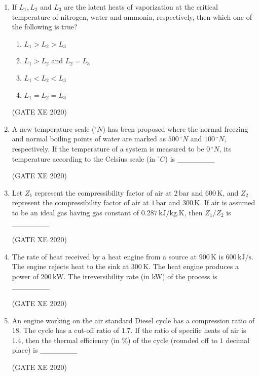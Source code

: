 \documentclass[12pt]{article}
\begin{document}
\begin{enumerate}
\item If $L_1, L_2$ and $L_3$ are the latent heats of vaporization at the critical temperature of nitrogen, water and ammonia, respectively, then which one of the following is true?
\begin{enumerate}
\item $L_1 > L_2 > L_3$
\item $L_1 > L_2$ and $L_2 = L_3$
\item $L_1 < L_2 < L_3$
\item $L_1 = L_2 = L_3$
\end{enumerate}
(GATE XE 2020)

\item A new temperature scale ($^{\circ}N$) has been proposed where the normal freezing and normal boiling points of water are marked as $500\,^{\circ}N$ and $100\,^{\circ}N$, respectively. If the temperature of a system is measured to be $0\,^{\circ}N$, its temperature according to the Celsius scale (in $^{\circ}C$) is \_\_\_\_\_\_\_  

(GATE XE 2020)

\item Let $Z_1$ represent the compressibility factor of air at $2 \,\text{bar}$ and $600 \,\text{K}$, and $Z_2$ represent the compressibility factor of air at $1 \,\text{bar}$ and $300 \,\text{K}$. If air is assumed to be an ideal gas having gas constant of $0.287 \,\text{kJ/kg.K}$, then $Z_1/Z_2$ is \_\_\_\_\_\_\_  

(GATE XE 2020)

\item The rate of heat received by a heat engine from a source at $900 \,\text{K}$ is $600 \,\text{kJ/s}$. The engine rejects heat to the sink at $300 \,\text{K}$. The heat engine produces a power of $200 \,\text{kW}$. The irreversibility rate (in kW) of the process is \_\_\_\_\_\_\_  

(GATE XE 2020)

\item An engine working on the air standard Diesel cycle has a compression ratio of $18$. The cycle has a cut-off ratio of $1.7$. If the ratio of specific heats of air is $1.4$, then the thermal efficiency (in \%) of the cycle (rounded off to $1$ decimal place) is \_\_\_\_\_\_\_  

(GATE XE 2020)


\end{enumerate}
\end{document}
